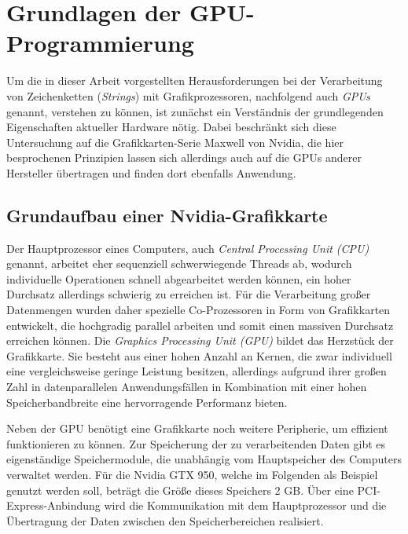 \chapter{Grundlagen der GPU-Programmierung}

Um die in dieser Arbeit vorgestellten Herausforderungen bei der Verarbeitung von Zeichenketten (\emph{Strings}) mit Grafikprozessoren, nachfolgend auch \emph{GPUs} genannt, verstehen zu können, ist zunächst ein Verständnis der grundlegenden Eigenschaften aktueller Hardware nötig.
Dabei beschränkt sich diese Untersuchung auf die Grafikkarten-Serie Maxwell von Nvidia, die hier besprochenen Prinzipien lassen sich allerdings auch auf die GPUs anderer Hersteller übertragen und finden dort ebenfalls Anwendung.

\section{Grundaufbau einer Nvidia-Grafikkarte}

Der Hauptprozessor eines Computers, auch \emph{Central Processing Unit (CPU)} genannt, arbeitet eher sequenziell schwerwiegende Threads ab, wodurch individuelle Operationen schnell abgearbeitet werden können, ein hoher Durchsatz allerdings schwierig zu erreichen ist.
Für die Verarbeitung großer Datenmengen wurden daher spezielle Co-Prozessoren in Form von Grafikkarten entwickelt, die hochgradig parallel arbeiten und somit einen massiven Durchsatz erreichen können.
Die \emph{Graphics Processing Unit (GPU)} bildet das Herzstück der Grafikkarte.
Sie besteht aus einer hohen Anzahl an Kernen, die zwar individuell eine vergleichsweise geringe Leistung besitzen, allerdings aufgrund ihrer großen Zahl in datenparallelen Anwendungsfällen in Kombination mit einer hohen Speicherbandbreite eine hervorragende Performanz bieten.

Neben der GPU benötigt eine Grafikkarte noch weitere Peripherie, um effizient funktionieren zu können.
Zur Speicherung der zu verarbeitenden Daten gibt es eigenständige Speichermodule, die unabhängig vom Hauptspeicher des Computers verwaltet werden.
Für die Nvidia GTX 950, welche im Folgenden als Beispiel genutzt werden soll, beträgt die Größe dieses Speichers 2 GB.
Über eine PCI-Express-Anbindung wird die Kommunikation mit dem Hauptprozessor und die Übertragung der Daten zwischen den Speicherbereichen realisiert.


